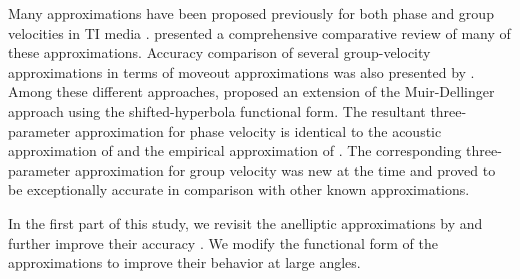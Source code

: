 Many approximations have been proposed previously for both phase and group velocities in TI media
\cite[e.g.][]{mdk,alkatsvankin,tsvankinvti,alkavti,alkavti2,alkavti3,schohoop,stopin,zhang,daley,fomel,ursin,fomelstovas,stovas2010,farra}. 
\cite{fowlervti} presented a comprehensive comparative review of many of these approximations.
Accuracy comparison of several group-velocity approximations \new{(}in terms of moveout approximations\new{)} was also presented by  \cite{golikov}. Among these different approaches, \cite{fomel} proposed an extension of the Muir-Dellinger approach \cite[]{md,mdk} 
using the shifted-hyperbola functional form. The resultant three-parameter approximation for phase velocity is identical to
the acoustic approximation of \cite{alkavti,alkavti2} and the empirical approximation of \cite{stopin}. 
The corresponding three-parameter approximation for group velocity was new  at the time and proved to be 
exceptionally accurate in comparison with other known approximations. 

In the first part of this study, we revisit the anelliptic approximations by \cite{fomel} and further improve their accuracy . We  modify the functional form of the approximations to improve their behavior at large angles.

